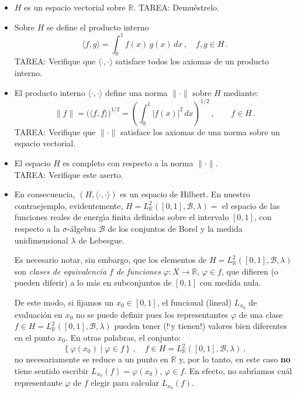 \begin{enumerate}
\begin{itemize}
\item
$H$ es un espacio vectorial sobre $\mathbb{R}$.
TAREA: Demu\'estrelo.

\item
Sobre $H$ se define el producto interno
$$
\langle f,g \rangle = \displaystyle \int_0^1 f(x)\,g(x)\,dx\,,\quad
f,g\in H\,.
$$
TAREA: Verifique que $\langle\cdot,\cdot\rangle$ satisface todos los
axiomas de un producto interno.

\item
El producto interno $\langle\cdot,\cdot\rangle$ define una norma
$\|\cdot\|$ sobre $H$ mediante:
$$
\|f\|=\big( \langle f,f\rangle \big)^{1/2}
= \left( \int_0^1|f(x)|^2\,dx \right)^{1/2}\,,\qquad f\in H\,.
$$
TAREA: Verifique que $\|\cdot\|$ satisface los axiomas de una norma
sobre un espacio vectorial.

\item
El espacio $H$ es completo con respecto a la norma $\|\cdot\|$.\\
TAREA: Verifique este aserto.

\item
En consecuencia, $(H,\langle\cdot,\cdot\rangle)$ es un espacio de
Hilbert.
En nuestro contraejemplo, evidentemente, 
$H=L_{\mathbb{R}}^2([0,1],\mathcal{B},\lambda)=$ el espacio de las
funciones reales de energ\'\i a finita definidas sobre el intervalo
$[0,1]$, con respecto a la $\sigma$-\'algebra $\mathcal{B}$ de los
conjuntos de Borel y la medida unidimensional $\lambda$ de Lebesgue.

Es necesario notar, sin embargo, que los elementos de
$H=L_{\mathbb{R}}^2([0,1],\mathcal{B},\lambda)$
son {\em clases de equivalencia $f$ de funciones\/}
$\varphi:X\to\mathbb{R}$, $\varphi\in f$, que difieren (o pueden diferir)
a lo m\'as en subconjuntos de $[0,1]$ con medida nula.

De este modo, si fijamos un $x_0\in[0,1]$, el funcional (lineal)
$L_{x_0}$ de evaluaci\'on en $x_0$ no se puede definir pues los
representantes $\varphi$ de una clase
$f\in H=L_{\mathbb{R}}^2([0,1],\mathcal{B},\lambda)$
pueden tener (!`y tienen!) valores bien diferentes en el punto $x_0$.
En otras palabras, el conjunto:
$$
\left\{ \varphi(x_0)\mid \varphi\in f \right\}\,,\quad
f\in H=L_{\mathbb{R}}^2([0,1],\mathcal{B},\lambda)\,,
$$
no necesariamente se reduce a un punto en $\mathbb{R}$ y, 
por lo tanto, en este caso {\bf no} tiene sentido escribir
$L_{x_0}(f)=\varphi(x_0)$, $\varphi\in f$.
En efecto, no sabr\'\i amos cu\'al representante $\varphi$ de $f$
elegir para calcular $L_{x_0}(f)$.


\end{itemize}
\end{enumerate}
